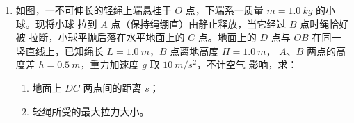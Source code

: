 \begin{enumerate}
\begin{enumerate}
\end{enumerate}
\begin{figure}[h!]
\flushright

\end{figure}



\newpage
\item 
{}
如图，一不可伸长的轻绳上端悬挂于 $ O $ 点，下端系一质量 $ m=1.0 \ kg $ 的小球。现将小球
拉到 $ A $ 点（保持绳绷直）由静止释放，当它经过 $ B $ 点时绳恰好被
拉断，小球平抛后落在水平地面上的 $ C $ 点。地面上的 $ D $ 点与 $ OB $
在同一竖直线上，已知绳长 $ L=1.0 \ m $，$ B $ 点离地高度 $ H=1.0 \ m $，
$ A $、$ B $ 两点的高度差 $ h=0.5 \ m $，重力加速度 $ g $ 取 $ 10 \ m/s^{2} $，不计空气
影响，求：
\begin{enumerate}
\renewcommand{\labelenumi}{\arabic{enumi}.}
\item
地面上 $ DC $ 两点间的距离 $ s $；

\item 
轻绳所受的最大拉力大小。



\end{enumerate}
\begin{figure}[h!]
\flushright

\end{figure}


\end{enumerate}

